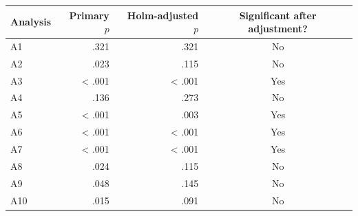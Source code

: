 \begin{tabular}{lrrc}
\toprule
Analysis & Primary $p$ & Holm-adjusted $p$ & Significant after adjustment? \\
\midrule
A1 & .321 & .321 & No \\
A2 & .023 & .115 & No \\
A3 & < .001 & < .001 & Yes \\
A4 & .136 & .273 & No \\
A5 & < .001 & .003 & Yes \\
A6 & < .001 & < .001 & Yes \\
A7 & < .001 & < .001 & Yes \\
A8 & .024 & .115 & No \\
A9 & .048 & .145 & No \\
A10 & .015 & .091 & No \\
\bottomrule
\end{tabular}
